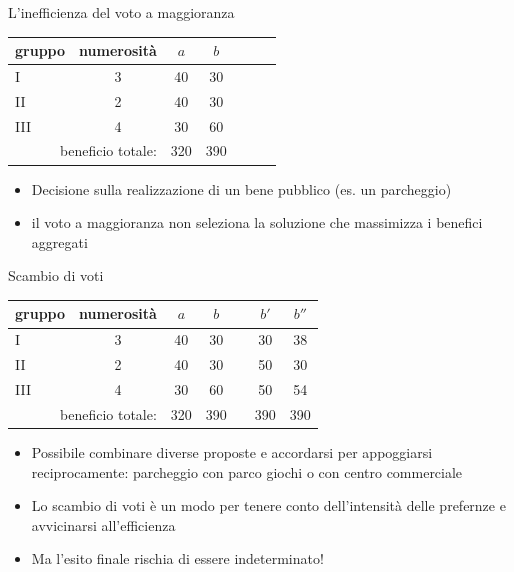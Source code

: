 \documentclass[aspectratio=64,11pt]{beamer}
\begin{document}
\begin{frame}{L'inefficienza del voto a maggioranza}
\begin{center}
\begin{tabular}{lcccccc}\toprule
    gruppo& numerosità &$a$ &$b$\\
    \midrule
    I      & 3 & 40 & 30\\
    II     & 2 & 40 & 30\\
    III    & 4 & 30 & 60\\\midrule
    \multicolumn{2}{r}{beneficio totale:} & 320 & 390\\
    \bottomrule
\end{tabular}
\end{center}

\begin{itemize}
\item Decisione sulla realizzazione di un bene pubblico (es. un parcheggio)
\item il voto a maggioranza non seleziona la soluzione che massimizza i benefici aggregati
\end{itemize}
\end{frame}

\begin{frame}{Scambio di voti}
\begin{center}
\begin{tabular}{lcccccc}\toprule
    gruppo& numerosità &$a$ &$b$ &&$b'$ &$b''$\\
    \midrule
    I      & 3 & 40 & 30 && 30 & 38\\
    II     & 2 & 40 & 30 && 50 & 30\\
    III    & 4 & 30 & 60 && 50 & 54\\\midrule
    \multicolumn{2}{r}{beneficio totale:} & 320 & 390 &&390 & 390\\
    \bottomrule
\end{tabular}
\end{center}

\begin{itemize}
\item Possibile combinare diverse proposte e accordarsi per appoggiarsi reciprocamente: parcheggio con parco giochi o con centro commerciale
\item Lo scambio di voti è un modo per tenere conto dell'intensità delle prefernze e avvicinarsi all'efficienza
\item Ma l'esito finale rischia di essere indeterminato!
\end{itemize}
\end{frame}
\end{document}
